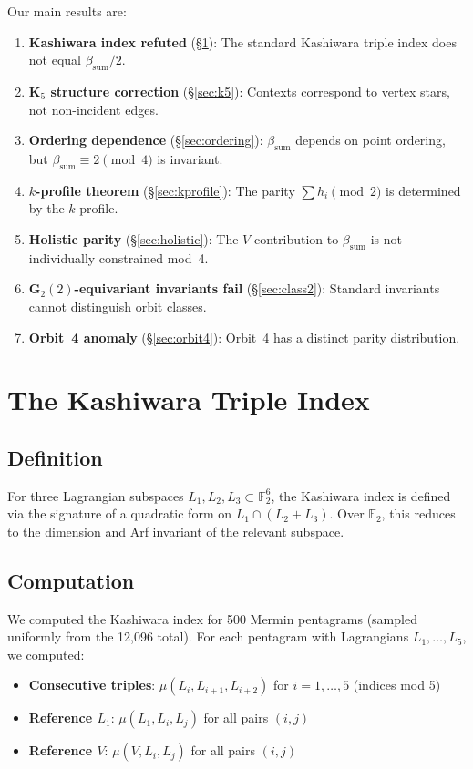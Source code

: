 \documentclass[11pt,a4paper]{article}
\theoremstyle{remark}
\newcommand{\F}{\mathbb{F}}
\begin{document}
Our main results are:
\begin{enumerate}
  \item \textbf{Kashiwara index refuted} (\S\ref{sec:kashiwara}): The standard Kashiwara triple index does not equal $\beta_{\mathrm{sum}}/2$.
  \item \textbf{K$_5$ structure correction} (\S\ref{sec:k5}): Contexts correspond to vertex stars, not non-incident edges.
  \item \textbf{Ordering dependence} (\S\ref{sec:ordering}): $\beta_{\mathrm{sum}}$ depends on point ordering, but $\beta_{\mathrm{sum}} \equiv 2 \pmod{4}$ is invariant.
  \item \textbf{$k$-profile theorem} (\S\ref{sec:kprofile}): The parity $\sum h_i \pmod{2}$ is determined by the $k$-profile.
  \item \textbf{Holistic parity} (\S\ref{sec:holistic}): The $V$-contribution to $\beta_{\mathrm{sum}}$ is not individually constrained mod~4.
  \item \textbf{G$_2(2)$-equivariant invariants fail} (\S\ref{sec:class2}): Standard invariants cannot distinguish orbit classes.
  \item \textbf{Orbit~4 anomaly} (\S\ref{sec:orbit4}): Orbit~4 has a distinct parity distribution.
\end{enumerate}


\section{The Kashiwara Triple Index}\label{sec:kashiwara}

\subsection{Definition}

For three Lagrangian subspaces $L_1, L_2, L_3 \subset \F_2^6$, the Kashiwara index is defined via the signature of a quadratic form on $L_1 \cap (L_2 + L_3)$.
Over $\F_2$, this reduces to the dimension and Arf invariant of the relevant subspace.

\subsection{Computation}

We computed the Kashiwara index for 500 Mermin pentagrams (sampled uniformly from the 12{,}096 total).
For each pentagram with Lagrangians $L_1, \ldots, L_5$, we computed:
\begin{itemize}
  \item \textbf{Consecutive triples}: $\mu(L_i, L_{i+1}, L_{i+2})$ for $i=1,\ldots,5$ (indices mod 5)
  \item \textbf{Reference $L_1$}: $\mu(L_1, L_i, L_j)$ for all pairs $(i,j)$
  \item \textbf{Reference $V$}: $\mu(V, L_i, L_j)$ for all pairs $(i,j)$
\end{itemize}
\end{document}
